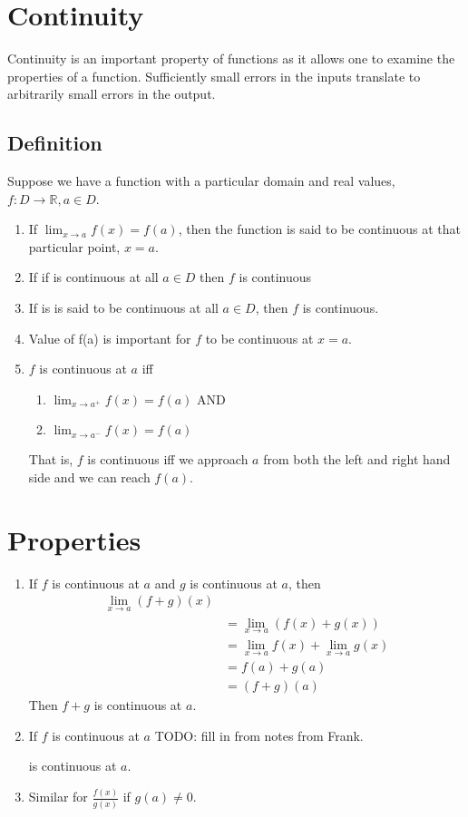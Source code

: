 \section{Continuity}
Continuity is an important property of functions as it allows one to examine the
properties of a function. Sufficiently small errors in the inputs translate to
arbitrarily small errors in the output.

\subsection{Definition}
Suppose we have a function with a particular domain and real values, \\
\noindent $f: D \to \mathbb{R}, a \in D$.\\
\begin{enumerate}
  \item If $\lim_{x \to a} f(x) = f(a)$, then the function is said to be continuous
at that particular point, $x = a$.
  \item If if is continuous at all $a \in D$ then $f$ is continuous
  \item If is is said to be continuous at all $a \in D$, then $f$ is continuous.
  \item Value of f(a) is important for $f$ to be continuous at $x = a$.
  \item $f$ is continuous at $a$ iff
  \begin{enumerate}
    \item $\lim_{x \to a^+} f(x) = f(a)$ AND
    \item $\lim_{x \to a^-} f(x) = f(a)$
  \end{enumerate}
That is, $f$ is continuous iff we approach $a$ from both the left and right hand
side and we can reach $f(a)$.
\end{enumerate}

\section{Properties}
\begin{enumerate}
  \item If $f$ is continuous at $a$ and $g$ is continuous at $a$, then
  \begin{align}
    \lim_{x \to a} (f+g)(x) & \\
    &= \lim_{x \to a} ( f(x) + g(x)) \\
    &= \lim_{x \to a} f(x) + \lim_{x \to a} g(x) \\
    &= f(a) + g(a) \\
    &= (f+g)(a)
  \end{align}
  Then $f+g$ is continuous at $a$.

  \item If $f$ is continuous at $a$
  TODO: fill in from notes from Frank.

  is continuous at $a$.
  \item Similar for $\frac{f(x)}{g(x)}$ if $g(a) \neq 0$.
\end{enumerate}


